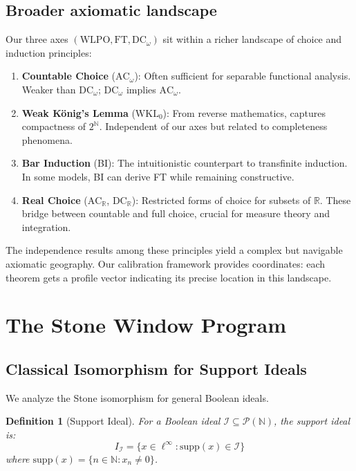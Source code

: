 \documentclass[11pt]{article}
\newtheorem{definition}[theorem]{Definition}
\newcommand{\N}{\mathbb{N}}
\newcommand{\WLPO}{\mathrm{WLPO}}
\newcommand{\FT}{\mathrm{FT}}
\newcommand{\DCw}{\mathrm{DC}_\omega}
\newcommand{\ACw}{\mathrm{AC}_\omega}
\newcommand{\ACR}{\mathrm{AC}_{\mathbb{R}}}
\newcommand{\DCR}{\mathrm{DC}_{\mathbb{R}}}
\newcommand{\WKLz}{\mathrm{WKL}_0}
\newcommand{\linf}{\ell^\infty}
\begin{document}
\subsection{Broader axiomatic landscape}

Our three axes $(\WLPO, \FT, \DCw)$ sit within a richer landscape of choice and induction principles:

\begin{enumerate}
\item \textbf{Countable Choice} ($\ACw{}$): Often sufficient for separable functional analysis. Weaker than $\DCw{}$; $\DCw{}$ implies $\ACw{}$.

\item \textbf{Weak König's Lemma} ($\WKLz{}$): From reverse mathematics, captures compactness of $2^{\mathbb{N}}$. Independent of our axes but related to completeness phenomena.

\item \textbf{Bar Induction} (BI): The intuitionistic counterpart to transfinite induction. In some models, BI can derive FT while remaining constructive.

\item \textbf{Real Choice} ($\ACR$, $\DCR$): Restricted forms of choice for subsets of $\mathbb{R}$. These bridge between countable and full choice, crucial for measure theory and integration.
\end{enumerate}

The independence results among these principles yield a complex but navigable axiomatic geography. Our calibration framework provides coordinates: each theorem gets a profile vector indicating its precise location in this landscape.

\section{The Stone Window Program}

\subsection{Classical Isomorphism for Support Ideals}

We analyze the Stone isomorphism for general Boolean ideals.

\begin{definition}[Support Ideal]
For a Boolean ideal $\mathcal{I} \subseteq \mathcal{P}(\N)$, the \emph{support ideal} is:
\[
I_{\mathcal{I}} = \{x \in \linf : \text{supp}(x) \in \mathcal{I}\}
\]
where $\text{supp}(x) = \{n \in \N : x_n \neq 0\}$.
\end{definition}
\end{document}
